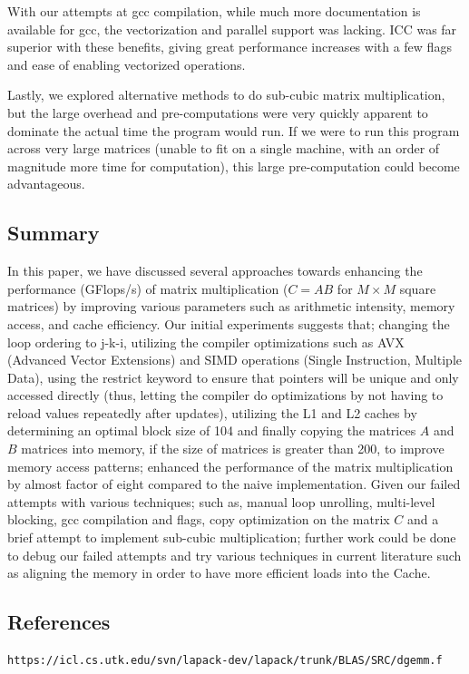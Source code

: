 \documentclass[12pt]{article}
\begin{document}
With our attempts at gcc compilation, while much more documentation is available for gcc, the vectorization and parallel support was lacking. ICC was far superior with these benefits, giving great performance increases with a few flags and ease of enabling vectorized operations. 

Lastly, we explored alternative methods to do sub-cubic matrix multiplication, but the large overhead and pre-computations were very quickly apparent to dominate the actual time the program would run. If we were to run this program across very large matrices (unable to fit on a single machine, with an order of magnitude more time for computation), this large pre-computation could become advantageous.

\subsection{Summary}

In this paper, we have discussed several approaches towards enhancing the performance (GFlops/s) of matrix multiplication ($C = AB$ for $M \times M$ square matrices) by improving various parameters such as arithmetic intensity, memory access, and cache efficiency. Our initial experiments suggests that; changing the loop ordering to j-k-i, utilizing the compiler optimizations such as AVX (Advanced Vector Extensions) and SIMD operations (Single Instruction, Multiple Data), using the restrict keyword to ensure that pointers will be unique and only accessed directly (thus, letting the compiler do optimizations by not having to reload values repeatedly  after updates), utilizing the L1 and L2 caches by determining an optimal block size of 104 and finally copying the matrices $A$ and $B$ matrices into memory, if the size of matrices is greater than 200, to improve memory access patterns; enhanced the performance of the matrix multiplication by almost factor of eight compared to the naive implementation. Given our failed attempts with various techniques; such as, manual loop unrolling, multi-level blocking, gcc compilation and flags, copy optimization on the matrix $C$  and a brief attempt to implement sub-cubic multiplication; further work could be done to debug our failed attempts and try various techniques in current literature such as aligning the memory in order to have more efficient loads into the Cache. 

\subsection{References}

\begin{verbatim}
https://icl.cs.utk.edu/svn/lapack-dev/lapack/trunk/BLAS/SRC/dgemm.f

\end{verbatim}
\end{document}
